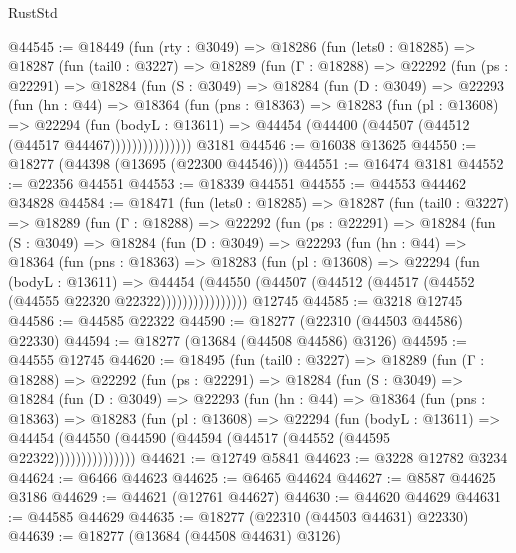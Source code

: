 \begin{lexlean}{RustStd}
\begin{coremodule}
@44545 := @18449
    (fun (rty : @3049) =>
    @18286
      (fun (lets0 : @18285) =>
      @18287
        (fun (tail0 : @3227) =>
        @18289
          (fun (Γ : @18288) =>
          @22292
            (fun (ps : @22291) =>
            @18284
              (fun (S : @3049) =>
              @18284
                (fun (D : @3049) =>
                @22293
                  (fun (hn : @44) =>
                  @18364
                    (fun (pns : @18363) =>
                    @18283
                      (fun (pl : @13608) =>
                      @22294
                        (fun (bodyL : @13611) =>
                        @44454 (@44400 (@44507 (@44512 (@44517 @44467)))))))))))))))
    @3181
@44546 := @16038 @13625
@44550 := @18277 (@44398 (@13695 (@22300 @44546)))
@44551 := @16474 @3181
@44552 := @22356 @44551
@44553 := @18339 @44551
@44555 := @44553 @44462 @34828
@44584 := @18471
    (fun (lets0 : @18285) =>
    @18287
      (fun (tail0 : @3227) =>
      @18289
        (fun (Γ : @18288) =>
        @22292
          (fun (ps : @22291) =>
          @18284
            (fun (S : @3049) =>
            @18284
              (fun (D : @3049) =>
              @22293
                (fun (hn : @44) =>
                @18364
                  (fun (pns : @18363) =>
                  @18283
                    (fun (pl : @13608) =>
                    @22294
                      (fun (bodyL : @13611) =>
                      @44454
                        (@44550
                          (@44507 (@44512 (@44517 (@44552 (@44555 @22320 @22322))))))))))))))))
    @12745
@44585 := @3218 @12745
@44586 := @44585 @22322
@44590 := @18277 (@22310 (@44503 @44586) @22330)
@44594 := @18277 (@13684 (@44508 @44586) @3126)
@44595 := @44555 @12745
@44620 := @18495
    (fun (tail0 : @3227) =>
    @18289
      (fun (Γ : @18288) =>
      @22292
        (fun (ps : @22291) =>
        @18284
          (fun (S : @3049) =>
          @18284
            (fun (D : @3049) =>
            @22293
              (fun (hn : @44) =>
              @18364
                (fun (pns : @18363) =>
                @18283
                  (fun (pl : @13608) =>
                  @22294
                    (fun (bodyL : @13611) =>
                    @44454 (@44550 (@44590 (@44594 (@44517 (@44552 (@44595 @22322)))))))))))))))
@44621 := @12749 @5841
@44623 := @3228 @12782 @3234
@44624 := @6466 @44623
@44625 := @6465 @44624
@44627 := @8587 @44625 @3186
@44629 := @44621 (@12761 @44627)
@44630 := @44620 @44629
@44631 := @44585 @44629
@44635 := @18277 (@22310 (@44503 @44631) @22330)
@44639 := @18277 (@13684 (@44508 @44631) @3126)

\end{coremodule}
\end{lexlean}
